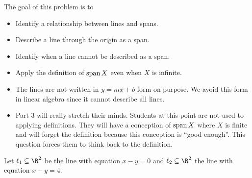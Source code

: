\documentclass{problemset}
\newcommand{\bookonlynewpage}{\begin{bookonly}\newpage\end{bookonly}}
\begin{document}
	\bookonlynewpage
	\question
	\begin{annotation}
		\begin{goals}

			The goal of this problem is to
			\begin{itemize}
				\item Identify a relationship between lines and spans.
				\item Describe a line through the origin as a span.
				\item Identify when a line cannot be described as a span.
				\item Apply the definition of $\operatorname{span} X$ even when $X$ is infinite.
			\end{itemize}
		\end{goals}

		\begin{notes}
			\begin{itemize}
				\item The lines are not written in $y=mx+b$ form on purpose.
					We avoid this form in linear algebra since it cannot
					describe all lines.
				\item Part 3 will really stretch their minds. Students at this point are not used
					to applying definitions. They will have a conception of $\operatorname{span} X$
					where $X$ is finite and will forget the definition because
					this conception is ``good enough''. This question forces
					them to think back to the definition.
			\end{itemize}
		\end{notes}
	\end{annotation}
	\label{linesAsSpans}
	Let $\ell_1\subseteq \R^2$ be the line with equation $x-y=0$ and $\ell_2\subseteq\R^2$
	the line with equation $x-y=4$.
\end{document}

